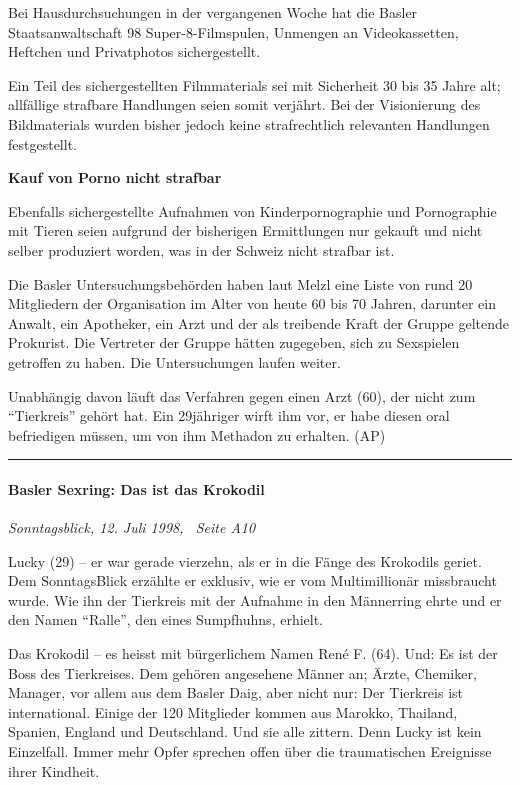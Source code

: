 Bei Hausdurchsuchungen in der vergangenen Woche hat die Basler
Staatsanwaltschaft 98 Super-8-Filmspulen, Unmengen an Videokassetten,
Heftchen und Privatphotos sichergestellt.

Ein Teil des sichergestellten Filmmaterials sei mit Sicherheit 30 bis 35
Jahre alt; allfällige strafbare Handlungen seien somit verjährt. Bei der
Visionierung des Bildmaterials wurden bisher jedoch keine strafrechtlich
relevanten Handlungen festgestellt.

\textbf{Kauf von Porno nicht strafbar}

Ebenfalls sichergestellte Aufnahmen von Kinderpornographie und
Pornographie mit Tieren seien aufgrund der bisherigen Ermittlungen nur
gekauft und nicht selber produziert worden, was in der Schweiz nicht
strafbar ist.

Die Basler Untersuchungsbehörden haben laut Melzl eine Liste von rund 20
Mitgliedern der Organisation im Alter von heute 60 bis 70 Jahren,
darunter ein Anwalt, ein Apotheker, ein Arzt und der als treibende Kraft
der Gruppe geltende Prokurist. Die Vertreter der Gruppe hätten
zugegeben, sich zu Sexspielen getroffen zu haben. Die Untersuchungen
laufen weiter.

Unabhängig davon läuft das Verfahren gegen einen Arzt (60), der nicht
zum ``Tierkreis'' gehört hat. Ein 29jähriger wirft ihm vor, er habe
diesen oral befriedigen müssen, um von ihm Methadon zu erhalten. (AP)

\begin{center}\rule{0.5\linewidth}{\linethickness}\end{center}

\hypertarget{basler-sexring-das-ist-das-krokodil}{%
\paragraph{Basler Sexring: Das ist das
Krokodil}\label{basler-sexring-das-ist-das-krokodil}}

\emph{Sonntagsblick, 12. Juli 1998,~ Seite A10}

Lucky (29) -- er war gerade vierzehn, als er in die Fänge des Krokodils
geriet. Dem SonntagsBlick erzählte er exklusiv, wie er vom
Multimillionär missbraucht wurde. Wie ihn der Tierkreis mit der Aufnahme
in den Männerring ehrte und er den Namen ``Ralle'', den eines
Sumpfhuhns, erhielt.

Das Krokodil -- es heisst mit bürgerlichem Namen René F. (64). Und: Es
ist der Boss des Tierkreises. Dem gehören angesehene Männer an; Ärzte,
Chemiker, Manager, vor allem aus dem Basler Daig, aber nicht nur: Der
Tierkreis ist international. Einige der 120 Mitglieder kommen aus
Marokko, Thailand, Spanien, England und Deutschland. Und sie alle
zittern. Denn Lucky ist kein Einzelfall. Immer mehr Opfer sprechen offen
über die traumatischen Ereignisse ihrer Kindheit.

